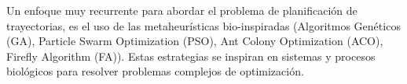 
Un enfoque muy recurrente para abordar el problema de planificación de trayectorias, es el uso de las metaheur\'{i}sticas bio-inspiradas (Algoritmos Genéticos (GA), Particle Swarm Optimization (PSO), Ant Colony Optimization (ACO), Firefly Algorithm (FA)). Estas estrategias se inspiran en sistemas y procesos biol\'{o}gicos para resolver problemas complejos de optimizaci\'{o}n.


